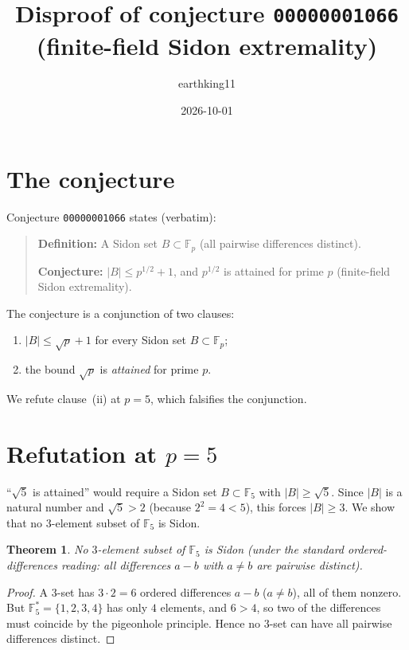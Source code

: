 \documentclass[11pt]{article}
\title{Disproof of conjecture \texttt{00000001066}\\(finite-field Sidon extremality)}
\author{earthking11}
\date{2026-10-01}
\theoremstyle{plain}
\newtheorem{theorem}{Theorem}
\theoremstyle{remark}
\begin{document}
\maketitle

\section{The conjecture}

Conjecture \texttt{00000001066} states (verbatim):

\begin{quote}
\textbf{Definition:} A Sidon set $B \subset \mathbb{F}_p$ (all pairwise
differences distinct).

\textbf{Conjecture:} $|B| \le p^{1/2} + 1$, and $p^{1/2}$ is attained for
prime $p$ (finite-field Sidon extremality).
\end{quote}

The conjecture is a conjunction of two clauses:
\begin{enumerate}
  \item[(i)] $|B| \le \sqrt{p} + 1$ for every Sidon set $B \subset \mathbb{F}_p$;
  \item[(ii)] the bound $\sqrt{p}$ is \emph{attained} for prime $p$.
\end{enumerate}
We refute clause~(ii) at $p = 5$, which falsifies the conjunction.

\section{Refutation at $p = 5$}

``$\sqrt{5}$ is attained'' would require a Sidon set $B \subset \mathbb{F}_5$
with $|B| \ge \sqrt{5}$.  Since $|B|$ is a natural number and
$\sqrt{5} > 2$ (because $2^2 = 4 < 5$), this forces $|B| \ge 3$.
We show that no $3$-element subset of $\mathbb{F}_5$ is Sidon.

\begin{theorem}
No $3$-element subset of $\mathbb{F}_5$ is Sidon (under the standard
ordered-differences reading: all differences $a-b$ with $a \ne b$ are
pairwise distinct).
\end{theorem}
\begin{proof}
A $3$-set has $3 \cdot 2 = 6$ ordered differences $a-b$ ($a \ne b$), all of
them nonzero.  But $\mathbb{F}_5^* = \{1,2,3,4\}$ has only $4$ elements, and
$6 > 4$, so two of the differences must coincide by the pigeonhole
principle.  Hence no $3$-set can have all pairwise differences distinct.
\end{proof}
\end{document}
